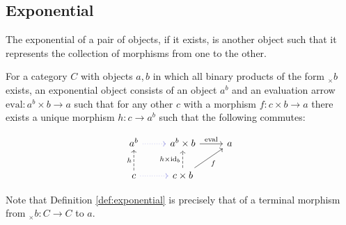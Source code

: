 \subsection{Exponential}
The exponential of a pair of objects, if it exists, is another object such that
it represents the collection of morphisms from one to the other.
\begin{definition}\label{def:exponential}
  For a category $C$ with objects $a, b$ in which all binary products of the
  form $_\times b$ exists, an exponential object consists of an object $a^b$ and
  an evaluation arrow $\mathrm{eval}:a^b \times b \to a$ such that for any other
  $c$ with a morphism $f:c\times b\to a$ there exists a unique morphism $h:c\to
  a^b$ such that the following commutes: \parencite{awodey:category_theory}

  \[\begin{tikzcd}[ampersand replacement=\&]
    {a^b} \& {a^b\times b} \& a \\
    c \& {c\times b}
    \arrow["{\mathrm{eval}}", from=1-2, to=1-3]
    \arrow["{h\times\id_b}", dashed, from=2-2, to=1-2]
    \arrow["f"', from=2-2, to=1-3]
    \arrow["h", dashed, from=2-1, to=1-1]
    \arrow[color={rgb,255:red,92;green,92;blue,214}, dotted, from=1-1, to=1-2]
    \arrow[color={rgb,255:red,92;green,92;blue,214}, dotted, from=2-1, to=2-2]
  \end{tikzcd}\]
\end{definition}

\begin{remark}
  Note that Definition \ref{def:exponential} is precisely that of a terminal
  morphism from $_\times b: C\to C$ to $a$.
\end{remark}